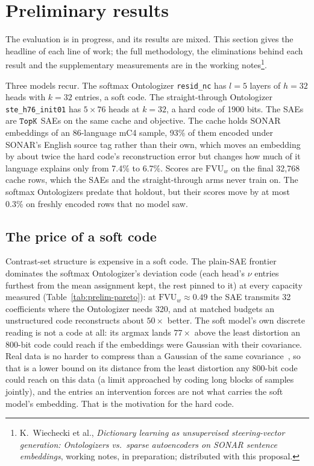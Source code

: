 \section{Preliminary results}
\label{sec:prelim}
The evaluation is in progress, and its results are mixed. This section
gives the headline of each line of work; the full methodology, the
eliminations behind each result and the supplementary measurements are
in the working notes\footnote{K.~Wiechecki et al., \emph{Dictionary
learning as unsupervised steering-vector generation: Ontologizers vs.\
sparse autoencoders on SONAR sentence embeddings}, working notes, in
preparation; distributed with this proposal.}.

Three models recur. The softmax Ontologizer \texttt{resid\_nc} has $l{=}5$
layers of $h{=}32$ heads with $k{=}32$ entries, a soft code. The
straight-through Ontologizer \texttt{ste\_h76\_init01} has $5\times76$
heads at $k{=}32$, a hard code of 1900 bits. The SAEs are $\mathop{\mathtt{TopK}}\limits$ SAEs
on the same cache and objective. The cache holds SONAR embeddings of an
86-language mC4 sample, 93\% of them encoded under SONAR's English source
tag rather than their own, which moves an embedding by about twice the
hard code's reconstruction error but changes how much of it language
explains only from 7.4\% to 6.7\%. Scores are $\mathrm{FVU}_w$ on the
final 32{,}768 cache rows, which the SAEs and the straight-through arms
never train on. The softmax Ontologizers predate that holdout, but their
scores move by at most 0.3\% on freshly encoded rows that no model saw.

\subsection{The price of a soft code}
\label{sec:prelim-pareto}
Contrast-set structure is expensive in a soft code. The plain-SAE
frontier dominates the softmax Ontologizer's deviation code (each head's
$\nu$ entries furthest from the mean assignment kept, the rest pinned to
it) at every capacity measured (Table~\ref{tab:prelim-pareto}): at
$\mathrm{FVU}_w \approx 0.49$ the SAE transmits 32 coefficients where the
Ontologizer needs 320, and at matched budgets an unstructured code
reconstructs about $50\times$ better. The soft model's own discrete
reading is not a code at all: its argmax lands $77\times$ above the least
distortion an 800-bit code could reach if the embeddings were Gaussian
with their covariance. Real data is no harder to compress than a Gaussian
of the same covariance~\cite{cover2006}, so that is a lower bound on its
distance from the least distortion any 800-bit code could reach on this
data (a limit approached by coding long blocks of samples jointly), and
the entries an intervention forces are not what carries the soft model's
embedding. That is the motivation for the hard code.

